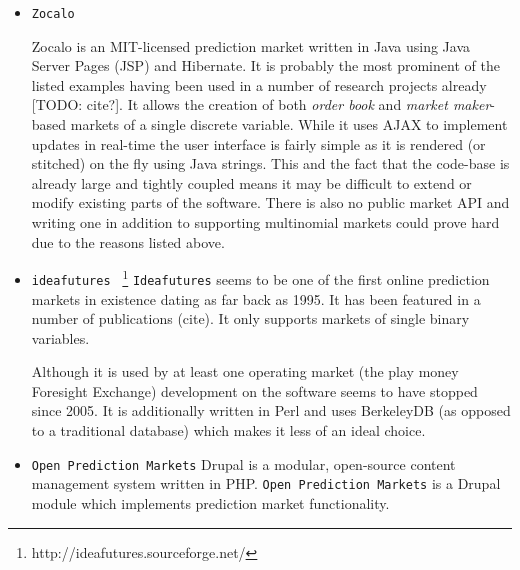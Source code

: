 \documentclass[bsc,frontabs,twoside,singlespacing,parskip,deptreport]{infthesis}     %
\begin{document}
\begin{itemize}
\item {\tt Zocalo}

	Zocalo is an MIT-licensed prediction market written in Java using Java Server Pages (JSP) and Hibernate. It is probably the most prominent of the listed examples having been used in a number of research projects already [TODO: cite?]. It allows the creation of both {\em order book} and {\em market maker}-based markets of a single discrete variable. While it uses AJAX to implement updates in real-time the user interface is fairly simple as it is rendered (or stitched) on the fly using Java strings. This and the fact that the code-base is already large and tightly coupled means it may be difficult to extend or modify existing parts of the software. There is also no public market API and writing one in addition to supporting multinomial markets could prove hard due to the reasons listed above. 

\item {\tt ideafutures } \footnote{http://ideafutures.sourceforge.net/}
	{\tt Ideafutures} seems to be one of the first online prediction markets in existence dating as far back as 1995. It has been featured in a number of publications (cite). It only supports markets of single binary variables. 

Although it is used by at least one operating market (the play money Foresight Exchange) development on the software seems to have stopped since 2005. It is additionally written in Perl and uses BerkeleyDB (as opposed to a traditional database) which makes it less of an ideal choice. 

\item {\tt Open Prediction Markets} 
	Drupal is a modular, open-source content management system written in PHP. {\tt Open Prediction Markets} is a Drupal module which implements prediction market functionality. 
\end{itemize}

\end{document}

